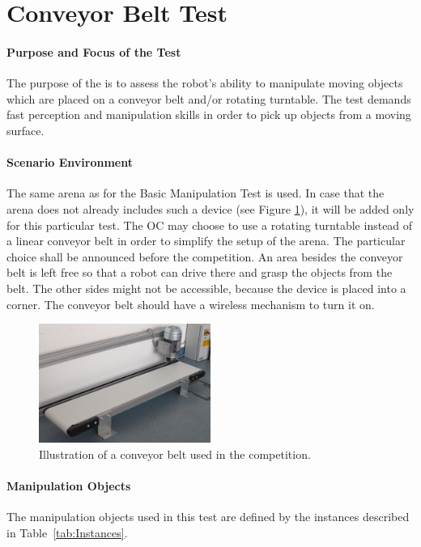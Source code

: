 \newpage
\section{Conveyor Belt Test}


\paragraph{Purpose and Focus of the Test}
The purpose of the  is to assess the robot's ability to manipulate moving objects which are placed on a conveyor belt and/or rotating turntable. The test demands fast perception and manipulation skills in order to pick up objects from a moving surface.

\paragraph{Scenario Environment}
The same arena as for the Basic Manipulation Test is used. In case that the arena does not already includes such a device (see Figure \ref{fig:conveyor_belt}), it will be added only for this particular test.
The OC may choose to use a rotating turntable instead of a linear conveyor belt in order to simplify the setup of the arena. The particular choice shall be announced before the competition.
An area besides the conveyor belt is left free so that a robot can drive there and grasp the objects from the belt. The other sides might not be accessible, because the device is placed into a corner. 
The conveyor belt should have a wireless mechanism to turn it on. 

\begin{figure} [h!]
\centering
\includegraphics[width=0.5\textwidth ]{./images/conveyor_belt.jpg}
\caption{Illustration of a conveyor belt used in the competition.}
\label{fig:conveyor_belt}
\end{figure}


\paragraph{Manipulation Objects}
The manipulation objects used in this test are defined by the instances described in Table~\ref{tab:Instances}.

